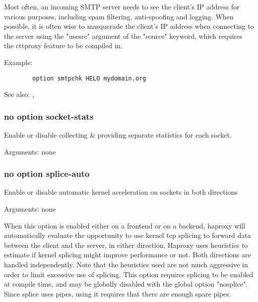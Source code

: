   Most often, an incoming SMTP server needs to see the client's IP address for
  various purposes, including spam filtering, anti-spoofing and logging. When
  possible, it is often wise to masquerade the client's IP address when
  connecting to the server using the "usesrc" argument of the "source" keyword,
  which requires the cttproxy feature to be compiled in.

  Example:
\begin{verbatim}
        option smtpchk HELO mydomain.org
\end{verbatim}


See also: , 

\subsubsection[socket-stats]{}
\subsubsection*{no option socket-stats}


  Enable or disable collecting \& providing separate statistics for each socket.


  Arguments: none

\subsubsection[splice-auto]{}
\subsubsection*{no option splice-auto}


  Enable or disable automatic kernel acceleration on sockets in both directions
  

  Arguments: none

  When this option is enabled either on a frontend or on a backend, haproxy
  will automatically evaluate the opportunity to use kernel tcp splicing to
  forward data between the client and the server, in either direction. Haproxy
  uses heuristics to estimate if kernel splicing might improve performance or
  not. Both directions are handled independently. Note that the heuristics used
  are not much aggressive in order to limit excessive use of splicing. This
  option requires splicing to be enabled at compile time, and may be globally
  disabled with the global option "nosplice". Since splice uses pipes, using it
  requires that there are enough spare pipes.

